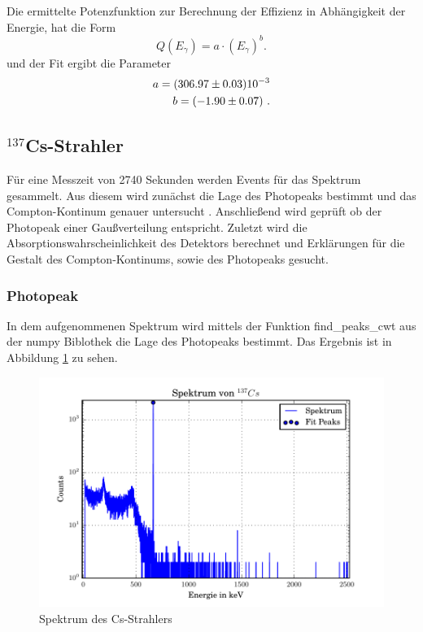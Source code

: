 Die ermittelte Potenzfunktion zur Berechnung der Effizienz in Abhängigkeit der Energie, hat die Form
\begin{equation}
  Q(E_\gamma)=  a \cdot \left( E_\gamma \right)^{b} .
  \label{eqn:QCs}
\end{equation}
und der Fit ergibt die Parameter 
\begin{eqnarray}
  a = (\num{306.97 +- 0.03})10^{-3} \\
  b = (\num{-1.90 +- 0.07}) \ .
\end{eqnarray}
 
\subsection{$^{137}$Cs-Strahler}
Für eine Messzeit von 2740 Sekunden werden Events für das Spektrum gesammelt. Aus diesem wird zunächst die Lage des Photopeaks bestimmt und das Compton-Kontinum genauer untersucht . Anschließend wird geprüft ob der Photopeak einer Gaußverteilung entspricht. Zuletzt wird die Absorptionswahrscheinlichkeit des Detektors berechnet und Erklärungen für die Gestalt des Compton-Kontinums, sowie des Photopeaks gesucht.


\subsubsection{Photopeak}
In dem aufgenommenen Spektrum wird mittels der Funktion find\_peaks\_cwt aus der numpy Biblothek die Lage des Photopeaks bestimmt. Das Ergebnis ist in Abbildung \ref{fig:SpekCS} zu sehen.
\begin{figure}
  \centering
  \includegraphics[width=\textwidth]{./build/SpektCS.pdf}
  \caption{Spektrum des Cs-Strahlers}
  \label{fig:SpekCS}
\end{figure}

